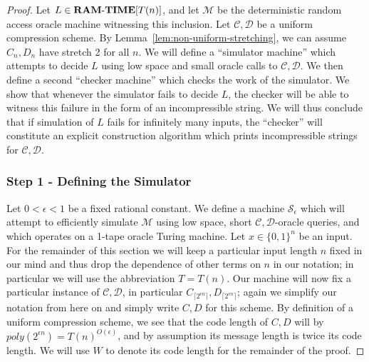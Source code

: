 \documentclass[11pt]{article}
\newcommand{\dash}{\text{-}}
\newcommand{\B}{\{0,1\}}
\def\cl{\bf}
\begin{document}
\begin{proof}
Let $L \in {\cl RAM\dash TIME}[T(n)]$, and let $\mathcal{M}$ be the deterministic random access oracle machine witnessing this inclusion. Let $\mathcal{C},\mathcal{D}$ be a uniform compression scheme. By Lemma~\ref{lem:non-uniform-stretching}, we can assume $C_n,D_n$ have stretch 2 for all $n$. We will define a ``simulator machine'' which attempts to decide $L$ using low space and small oracle calls to $\mathcal{C},\mathcal{D}$. We then define a second ``checker machine'' which checks the work of the simulator. We show that whenever the simulator fails to decide $L$, the checker will be able to witness this failure in the form of an incompressible string. We will thus conclude that if simulation of $L$ fails for infinitely many inputs, the ``checker'' will constitute an explicit construction algorithm which prints incompressible strings for $\mathcal{C},\mathcal{D}$.

\subsubsection*{Step 1 - Defining the Simulator}
Let $0 < \epsilon < 1$ be a fixed rational constant. We define a machine $\mathcal{S}_{\epsilon}$ which will attempt to efficiently simulate $\mathcal{M}$ using low space, short $\mathcal{C},\mathcal{D}$-oracle queries, and which operates on a 1-tape oracle Turing machine. Let $x \in \B^n$ be an input. For the remainder of this section we will keep a particular input length $n$ fixed in our mind and thus drop the dependence of other terms on $n$ in our notation; in particular we will use the abbreviation $T = T(n)$. Our machine will now fix a particular instance of $\mathcal{C},\mathcal{D}$, in particular $C_{\lceil 2^{\epsilon n}\rceil }, D_{\lceil 2^{\epsilon n} \rceil}$; again we simplify our notation from here on and simply write $C,D$ for this scheme. By definition of a uniform compression scheme, we see that the code length of $C,D$ will by $poly(2^{\epsilon n}) = T(n)^{O(\epsilon)}$, and by assumption its message length is twice its code length. We will use $W$ to denote its code length for the remainder of the proof. 


\end{proof}
\end{document}
